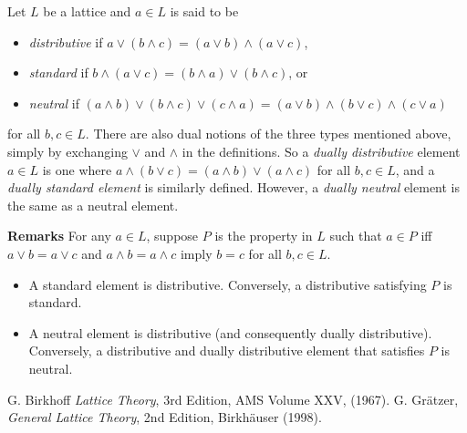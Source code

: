 \documentclass[12pt]{article}
\begin{document}
Let $L$ be a lattice and $a\in L$ is said to be
\begin{itemize}
\item \emph{distributive} if $a\vee (b\wedge c)=(a\vee b)\wedge (a\vee c)$,
\item \emph{standard} if $b\wedge (a\vee c)=(b\wedge a)\vee (b\wedge c)$, or
\item \emph{neutral} if $(a\wedge b)\vee (b\wedge c)\vee (c\wedge a) = (a\vee b)\wedge (b\vee c)\wedge (c\vee a)$
\end{itemize}
for all $b,c\in L$.  There are also dual notions of the three types mentioned above, simply by exchanging $\vee$ and $\wedge$ in the definitions.  So a \emph{dually distributive} element $a\in L$ is one where $a\wedge (b\vee c)=(a\wedge b)\vee (a\wedge c)$ for all $b,c\in L$, and a \emph{dually standard element} is similarly defined.  However, a \emph{dually neutral} element is the same as a neutral element.

\textbf{Remarks}  For any $a\in L$, suppose $P$ is the property in $L$ such that $a\in P$ iff $a\vee b=a\vee c$ and $a\wedge b=a\wedge c$ imply $b=c$ for all $b,c\in L$.
\begin{itemize}
\item A standard element is distributive.  Conversely, a distributive satisfying  $P$ is standard.
\item A neutral element is distributive (and consequently dually distributive).  Conversely, a distributive and dually distributive element that satisfies $P$ is neutral.
\end{itemize}

\begin{thebibliography}{8}
 G. Birkhoff {\em Lattice Theory}, 3rd Edition, AMS Volume XXV, (1967).
 G. Gr\"{a}tzer, {\em General Lattice Theory}, 2nd Edition, Birkh\"{a}user (1998).
\end{thebibliography}
\end{document}
